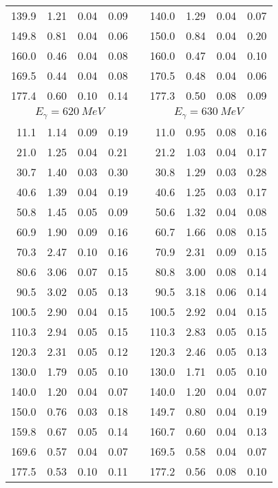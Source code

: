\begin{table}[htbp]
\begin{center}
\begin{tabular}{|r|r|c|c|l|r|r|c|c|}
139.9 &  1.21 &  0.04 &  0.09 & & 140.0 &  1.29 &  0.04 &  0.07 \\ 
149.8 &  0.81 &  0.04 &  0.06 & & 150.0 &  0.84 &  0.04 &  0.20 \\ 
160.0 &  0.46 &  0.04 &  0.08 & & 160.0 &  0.47 &  0.04 &  0.10 \\ 
169.5 &  0.44 &  0.04 &  0.08 & & 170.5 &  0.48 &  0.04 &  0.06 \\ 
177.4 &  0.60 &  0.10 &  0.14 & & 177.3 &  0.50 &  0.08 &  0.09 \\ 
\hline 
\hline 
\multicolumn{4}{|c|}{ $E_{\gamma}=620~MeV$} & & 
\multicolumn{4}{c|}{ $E_{\gamma}=630~MeV$} \\ 
\cline{1-4} 
\cline{6-9} 
 11.1 &  1.14 &  0.09 &  0.19 & &  11.0 &  0.95 &  0.08 &  0.16 \\ 
 21.0 &  1.25 &  0.04 &  0.21 & &  21.2 &  1.03 &  0.04 &  0.17 \\ 
 30.7 &  1.40 &  0.03 &  0.30 & &  30.8 &  1.29 &  0.03 &  0.28 \\ 
 40.6 &  1.39 &  0.04 &  0.19 & &  40.6 &  1.25 &  0.03 &  0.17 \\ 
 50.8 &  1.45 &  0.05 &  0.09 & &  50.6 &  1.32 &  0.04 &  0.08 \\ 
 60.9 &  1.90 &  0.09 &  0.16 & &  60.7 &  1.66 &  0.08 &  0.15 \\ 
 70.3 &  2.47 &  0.10 &  0.16 & &  70.9 &  2.31 &  0.09 &  0.15 \\ 
 80.6 &  3.06 &  0.07 &  0.15 & &  80.8 &  3.00 &  0.08 &  0.14 \\ 
 90.5 &  3.02 &  0.05 &  0.13 & &  90.5 &  3.18 &  0.06 &  0.14 \\ 
100.5 &  2.90 &  0.04 &  0.15 & & 100.5 &  2.92 &  0.04 &  0.15 \\ 
110.3 &  2.94 &  0.05 &  0.15 & & 110.3 &  2.83 &  0.05 &  0.15 \\ 
120.3 &  2.31 &  0.05 &  0.12 & & 120.3 &  2.46 &  0.05 &  0.13 \\ 
130.0 &  1.79 &  0.05 &  0.10 & & 130.0 &  1.71 &  0.05 &  0.10 \\ 
140.0 &  1.20 &  0.04 &  0.07 & & 140.0 &  1.20 &  0.04 &  0.07 \\ 
150.0 &  0.76 &  0.03 &  0.18 & & 149.7 &  0.80 &  0.04 &  0.19 \\ 
159.8 &  0.67 &  0.05 &  0.14 & & 160.7 &  0.60 &  0.04 &  0.13 \\ 
169.6 &  0.57 &  0.04 &  0.07 & & 169.5 &  0.58 &  0.04 &  0.07 \\ 
177.5 &  0.53 &  0.10 &  0.11 & & 177.2 &  0.56 &  0.08 &  0.10 \\ 
\cline{1-4} 
\cline{6-9} 
\end{tabular} 

\end{center} 
\end{table}
